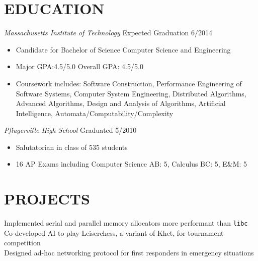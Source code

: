 \documentclass[margin]{res}
\begin{document}
\begin{resume}
\section{EDUCATION} {\sl Massachusetts Institute of Technology} 
                    \hfill Expected Graduation 6/2014
                    \begin{itemize} \itemsep -2pt %
                        \item Candidate for Bachelor of Science Computer Science
                        and Engineering
                        \item Major GPA:4.5/5.0 Overall GPA: 4.5/5.0 
                        \item Coursework includes:
                          Software Construction,
                          Performance Engineering of Software Systems, 
                          Computer System Engineering, 
                          Distributed Algorithms,
                          Advanced Algorithms,
                          Design and Analysis of Algorithms, 
                          Artificial Intelligence, 
                          Automata/Computability/Complexity
                    \end{itemize}

                    {\sl Pflugerville High School} \hfill Graduated 5/2010
                    \begin{itemize} \itemsep -2pt %
                         \item Salutatorian in class of 535 students
                         \item 16 AP Exams including Computer Science AB: 5, 
                               Calculus BC: 5, E\&M: 5
                    \end{itemize}

\section{PROJECTS}  Implemented serial and parallel memory allocators more
                      performant than \texttt{libc} \\
                    Co-developed AI to play Leiserchess, a variant of Khet, for 
                      tournament competition \\
                    Designed ad-hoc networking protocol for first responders in
                      emergency situations
 

\end{resume}
\end{document}
